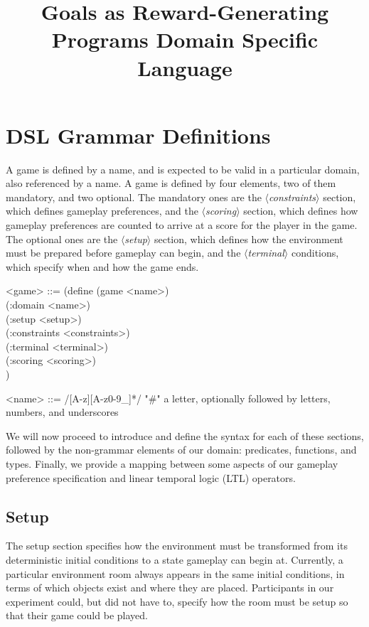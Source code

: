 \documentclass{article}
\title{Goals as Reward-Generating Programs Domain Specific Language}
\newcommand{\dsl}[1]{{\it $\langle$#1$\rangle$}}
\begin{document}
\maketitle

\section{DSL Grammar Definitions}

A game is defined by a name, and is expected to be valid in a particular domain, also referenced by a name.
A game is defined by four elements, two of them mandatory, and two optional.
The mandatory ones are the \dsl{constraints} section, which defines gameplay preferences, and the \dsl{scoring} section, which defines how gameplay preferences are counted to arrive at a score for the player in the game.
The optional ones are the \dsl{setup} section, which defines how the environment must be prepared before gameplay can begin, and the \dsl{terminal} conditions, which specify when and how the game ends.

\begin{grammar}
<game> ::= (define (game <name>) \\
  (:domain <name>) \\
  (:setup <setup>) \\
  (:constraints <constraints>) \\
  (:terminal <terminal>) \\
  (:scoring <scoring>) \\)

<name> ::= /[A-z][A-z0-9_]*/ "#" a letter, optionally followed by letters, numbers, and underscores
\end{grammar}

We will now proceed to introduce and define the syntax for each of these sections, followed by the non-grammar elements of our domain: predicates, functions, and types.
Finally, we provide a mapping between some aspects of our gameplay preference specification and linear temporal logic (LTL) operators.

\subsection{Setup} \label{sec:setup}
The setup section specifies how the environment must be transformed from its deterministic initial conditions to a state gameplay can begin at.
Currently, a particular environment room always appears in the same initial conditions, in terms of which objects exist and where they are placed.
Participants in our experiment could, but did not have to, specify how the room must be setup so that their game could be played.
\end{document}
